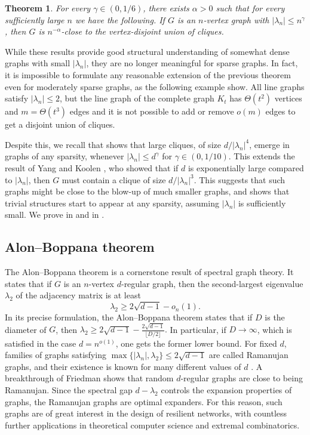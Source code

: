 \documentclass[11pt]{article}
\theoremstyle{plain}
\newtheorem{theorem}{Theorem}[section]
\theoremstyle{definition}
\begin{document}
\begin{theorem}\label{thm:MAIN_SE2}
    For every $\gamma\in (0, 1/6)$, there exists $\alpha>0$ such that for every sufficiently large $n$ we have the following. 
    If $G$ is an $n$-vertex graph with $|\lambda_n|\leq n^{\gamma}$, then $G$ is $n^{-\alpha}$-close to the vertex-disjoint union of cliques.
\end{theorem}

While these results provide good structural understanding of somewhat dense graphs with small $|\lambda_n|$, they are no longer meaningful for sparse graphs. 
In fact, it is impossible to formulate any reasonable extension of the previous theorem even for moderately sparse graphs, as the following example show. 
All line graphs satisfy $|\lambda_n|\leq 2$, but the line graph of the complete graph $K_t$ has $\Theta(t^2)$ vertices and $m=\Theta(t^3)$ edges and it is not possible to add or remove $o(m)$ edges to get a disjoint union of cliques.


Despite this, we recall that  shows that large cliques, of size $d/|\lambda_n|^4$, emerge in graphs of any sparsity, whenever $|\lambda_n|\leq d^{\gamma}$ for $\gamma\in (0, 1/10)$. This extends the result of Yang and Koolen \cite{YK}, who showed that if $d$ is exponentially large compared to $|\lambda_n|$, then $G$ must contain a clique of size $d/|\lambda_n|^3$. This suggests that such graphs might be close to the blow-up of much smaller graphs, and shows that trivial structures start to appear at any sparsity, assuming $|\lambda_n|$ is sufficiently small. 
We prove  in  and  in .


\subsection{Alon--Boppana theorem} \label{sec: intro alon--boppana}

The Alon--Boppana theorem \cite{alon-boppana} is a cornerstone result of spectral graph theory. It states that if $G$ is an $n$-vertex $d$-regular graph, then the second-largest eigenvalue $\lambda_2$ of the adjacency matrix is at least $$\lambda_2\geq 2\sqrt{d-1}-o_n(1).$$  In its precise formulation, the Alon--Boppana theorem states that if $D$ is the diameter of $G$, then $\lambda_2\geq 2\sqrt{d-1}-\frac{2\sqrt{d-1}}{\lfloor D/2\rfloor}.$
In particular, if $D\rightarrow \infty$, which is satisfied in the case $d=n^{o(1)}$, one gets the former lower bound. 
For fixed $d$, families of graphs satisfying $\max\{|\lambda_n|,\lambda_2\}\leq 2\sqrt{d-1}$ are called Ramanujan graphs, and their existence is known for many different values of $d$ \cite{ramanujan}. 
A breakthrough of Friedman \cite{Friedman} shows that random $d$-regular graphs are close to being Ramanujan. Since the spectral gap $d-\lambda_2$ controls the expansion properties of graphs, the Ramanujan graphs are optimal expanders. For this reason, such graphs are of great interest in the design of resilient networks, with countless further applications in theoretical computer science and extremal combinatorics.
\end{document}
